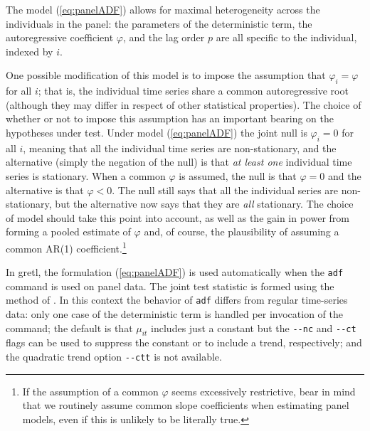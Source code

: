 The model (\ref{eq:panelADF}) allows for maximal heterogeneity across
the individuals in the panel: the parameters of the deterministic
term, the autoregressive coefficient $\varphi$, and the lag order $p$
are all specific to the individual, indexed by $i$.

One possible modification of this model is to impose the assumption
that $\varphi_i = \varphi$ for all $i$; that is, the individual time
series share a common autoregressive root (although they may differ in
respect of other statistical properties). The choice of whether or not
to impose this assumption has an important bearing on the hypotheses
under test. Under model (\ref{eq:panelADF}) the joint null is
$\varphi_i = 0$ for all $i$, meaning that all the individual time
series are non-stationary, and the alternative (simply the negation of
the null) is that \emph{at least one} individual time series is
stationary.  When a common $\varphi$ is assumed, the null is that
$\varphi = 0$ and the alternative is that $\varphi < 0$. The null
still says that all the individual series are non-stationary, but the
alternative now says that they are \emph{all} stationary.  The choice
of model should take this point into account, as well as the gain in
power from forming a pooled estimate of $\varphi$ and, of course, the
plausibility of assuming a common AR(1) coefficient.\footnote{If the
  assumption of a common $\varphi$ seems excessively restrictive, bear
  in mind that we routinely assume common slope coefficients when
  estimating panel models, even if this is unlikely to be literally
  true.}

In gretl, the formulation (\ref{eq:panelADF}) is used
automatically when the \texttt{adf} command is used on panel data. The
joint test statistic is formed using the method of \citet*{IPS03}. In
this context the behavior of \texttt{adf} differs from regular
time-series data: only one case of the deterministic term is handled
per invocation of the command; the default is that $\mu_{it}$ includes
just a constant but the \verb|--nc| and \verb|--ct| flags can be used
to suppress the constant or to include a trend, respectively; and the
quadratic trend option \verb|--ctt| is not available.

